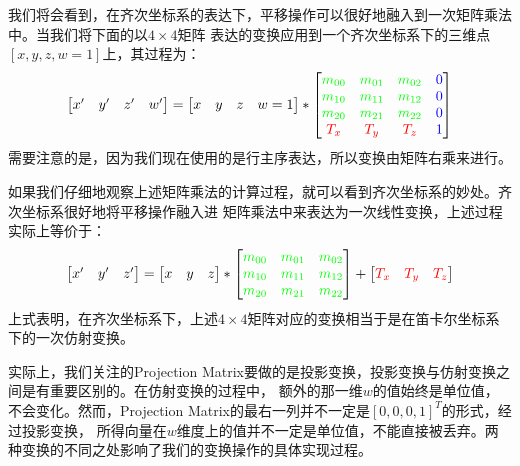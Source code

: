 \documentclass[12pt]{article}
\begin{document}
\indent{}我们将会看到，在齐次坐标系的表达下，平移操作可以很好地融入到一次矩阵乘法中。当我们将下面的以$4\times 4$矩阵
表达的变换应用到一个齐次坐标系下的三维点$[x,y,z,w=1]$上，其过程为：
\begin{displaymath}
\begin{bmatrix}
x' & y' & z' & w'
\end{bmatrix}
=
\begin{bmatrix}
x & y & z & w = 1
\end{bmatrix}
*
\begin{bmatrix}
\color{green}{m_{00}} & \color{green}{m_{01}} & \color{green}{m_{02}} & \color{blue}{0}\\
\color{green}{m_{10}} & \color{green}{m_{11}} & \color{green}{m_{12}} & \color{blue}{0}\\
\color{green}{m_{20}} & \color{green}{m_{21}} & \color{green}{m_{22}} & \color{blue}{0}\\
\color{red}{T_x} & \color{red}{T_y} & \color{red}{T_z} & \color{blue}{1}\\
\end{bmatrix}
\end{displaymath}
\noindent{}需要注意的是，因为我们现在使用的是行主序表达，所以变换由矩阵右乘来进行。

\indent{}如果我们仔细地观察上述矩阵乘法的计算过程，就可以看到齐次坐标系的妙处。齐次坐标系很好地将平移操作融入进
矩阵乘法中来表达为一次线性变换，上述过程实际上等价于：
\begin{displaymath}
\begin{bmatrix}
x' & y' & z'
\end{bmatrix}
=
\begin{bmatrix}
x & y & z
\end{bmatrix}
*
\begin{bmatrix}
\color{green}{m_{00}} & \color{green}{m_{01}} & \color{green}{m_{02}}\\
\color{green}{m_{10}} & \color{green}{m_{11}} & \color{green}{m_{12}}\\
\color{green}{m_{20}} & \color{green}{m_{21}} & \color{green}{m_{22}}\\
\end{bmatrix}
+
\begin{bmatrix}
\color{red}{T_x} & \color{red}{T_y} & \color{red}{T_z}
\end{bmatrix}
\end{displaymath}
\noindent{}上式表明，在齐次坐标系下，上述$4\times 4$矩阵对应的变换相当于是在笛卡尔坐标系下的一次仿射变换。

\indent{}实际上，我们关注的Projection Matrix要做的是投影变换，投影变换与仿射变换之间是有重要区别的。在仿射变换的过程中，
额外的那一维$w$的值始终是单位值，不会变化。然而，Projection Matrix的最右一列并不一定是$[0,0,0,1]^T$的形式，经过投影变换，
所得向量在$w$维度上的值并不一定是单位值，不能直接被丢弃。两种变换的不同之处影响了我们的变换操作的具体实现过程。
\end{document}
